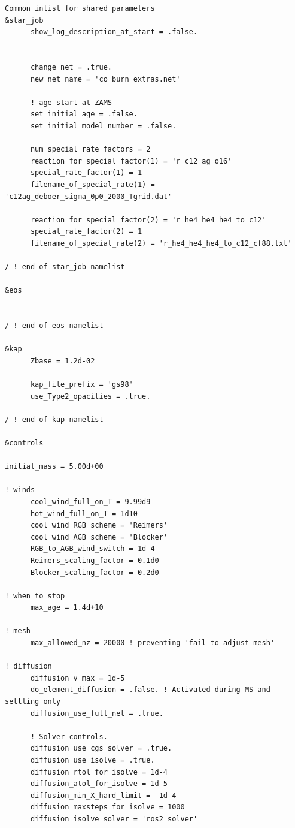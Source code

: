 \documentclass[a4paper,10pt]{article}
\begin{document}


\appendix
{}
\begin{verbatim}
Common inlist for shared parameters
&star_job
      show_log_description_at_start = .false.

      
      change_net = .true.      
      new_net_name = 'co_burn_extras.net'
      
      ! age start at ZAMS
      set_initial_age = .false.
      set_initial_model_number = .false.

      num_special_rate_factors = 2
      reaction_for_special_factor(1) = 'r_c12_ag_o16'
      special_rate_factor(1) = 1
      filename_of_special_rate(1) = 'c12ag_deboer_sigma_0p0_2000_Tgrid.dat'

      reaction_for_special_factor(2) = 'r_he4_he4_he4_to_c12'
      special_rate_factor(2) = 1
      filename_of_special_rate(2) = 'r_he4_he4_he4_to_c12_cf88.txt'

/ ! end of star_job namelist

&eos


/ ! end of eos namelist

&kap
      Zbase = 1.2d-02

      kap_file_prefix = 'gs98'
      use_Type2_opacities = .true.

/ ! end of kap namelist

&controls

initial_mass = 5.00d+00
      
! winds
      cool_wind_full_on_T = 9.99d9
      hot_wind_full_on_T = 1d10
      cool_wind_RGB_scheme = 'Reimers'
      cool_wind_AGB_scheme = 'Blocker'
      RGB_to_AGB_wind_switch = 1d-4
      Reimers_scaling_factor = 0.1d0  
      Blocker_scaling_factor = 0.2d0
      
! when to stop
      max_age = 1.4d+10

! mesh
      max_allowed_nz = 20000 ! preventing 'fail to adjust mesh'

! diffusion
      diffusion_v_max = 1d-5
      do_element_diffusion = .false. ! Activated during MS and settling only
      diffusion_use_full_net = .true.

      ! Solver controls.
      diffusion_use_cgs_solver = .true.
      diffusion_use_isolve = .true.
      diffusion_rtol_for_isolve = 1d-4
      diffusion_atol_for_isolve = 1d-5
      diffusion_min_X_hard_limit = -1d-4
      diffusion_maxsteps_for_isolve = 1000
      diffusion_isolve_solver = 'ros2_solver'


\end{verbatim}
\end{document}
